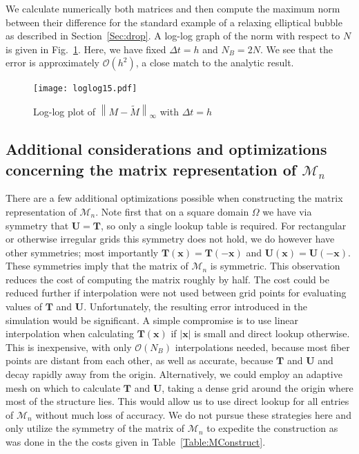 \documentclass[preprint,12pt]{elsarticle}
\newcommand{\norm}[1]{\left\lVert#1\right\rVert}
\begin{document}
 We calculate numerically both matrices and then compute the maximum norm between their difference for the standard example of
 a relaxing elliptical bubble as described in Section~\ref{Sec:drop}. A log-log graph of the norm with respect to $N$ is given in 
 Fig.~\ref{fig:loglog15}. Here, we have fixed $\Delta t = h$ and $N_B=2N$. We see that the error is approximately $\mathcal{O}(h^2)$, a close match to the analytic result.
\begin{figure}[!b]
  \begin{center}
    \texttt{[image: loglog15.pdf]}
  \end{center}
  \caption{\small Log-log plot of $\norm{M-\tilde{M}}_\infty$ with $\Delta t = h$}
  \label{fig:loglog15}
\end{figure}

\subsection{Additional considerations and optimizations concerning the matrix representation of $\mathcal{M}_n$}
There are a few additional optimizations possible when constructing the matrix representation of $\mathcal{M}_n$.
Note first that on a square domain $\Omega$ we have via symmetry that $\mathbf{U}=\mathbf{T}$, so only a single lookup table is required.
For rectangular or otherwise irregular grids this symmetry does not hold, we do however have other symmetries; most importantly $\mathbf{T}(\mathbf{x}) = \mathbf{T}(-\mathbf{x})$ and $\mathbf{U}(\mathbf{x}) = \mathbf{U}(-\mathbf{x})$.
These symmetries imply that the matrix of $\mathcal{M}_n$ is symmetric. This observation reduces the cost of computing the matrix roughly by half. The cost could be reduced further if interpolation were not used between grid points for evaluating values of $\mathbf{T}$ and $\mathbf{U}$. Unfortunately, the resulting error introduced in the simulation would be significant. A simple compromise is to use linear interpolation when calculating $\mathbf{T}(\mathbf{x})$ if $|\mathbf{x}|$ is small and direct lookup otherwise. This is inexpensive, with only $\mathcal{O}(N_B)$ interpolations needed, because most fiber points are distant from each other, as well as accurate, because $\mathbf{T}$ and $\mathbf{U}$ and decay rapidly away from the origin. 
Alternatively, we could employ an adaptive mesh on which to calculate $\mathbf{T}$ and $\mathbf{U}$, taking a dense grid around the origin where most of the structure lies. This would allow us to use direct lookup for all entries of $\mathcal{M}_n$ without much loss of accuracy. We do not pursue these strategies here and only utilize the symmetry of the matrix of $\mathcal{M}_n$ to expedite the construction as was done in the the costs given in Table~\ref{Table:MConstruct}.
\end{document}
